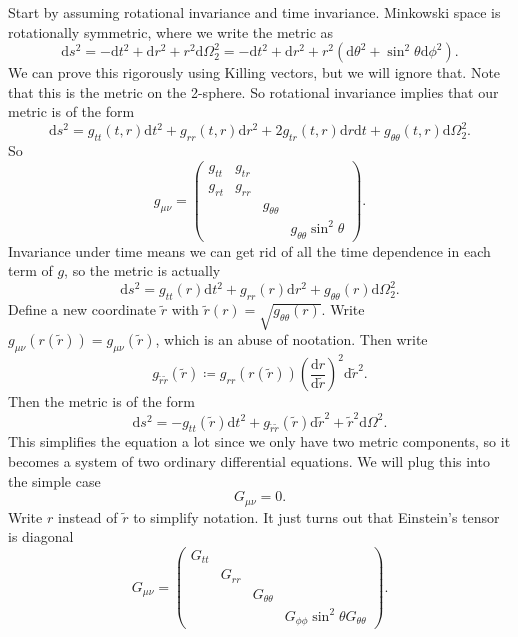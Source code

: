Start by assuming rotational invariance and time invariance. Minkowski space is rotationally symmetric, where we write the metric as
\[
	\mathrm{d} s^2=-\mathrm{d} t^2+\mathrm{d} r^2 + r^2 \mathrm{d} \Omega _2^2 = -\mathrm{d} t^2+\mathrm{d} r^2+r^2 \left( \mathrm{d} \theta ^2+ \sin ^2\theta \mathrm{d} \phi ^2 \right)  
.\]
We can prove this rigorously using Killing vectors, but we will ignore that. Note that this is the metric on the 2-sphere. So rotational invariance implies that our metric is of the form
\[
	\mathrm{d} s^2 = g_{tt} (t,r)\mathrm{d} t^2 + g_{rr} (t,r)\mathrm{d} r^2+2g_{tr} (t,r)\mathrm{d} r \mathrm{d} t+g_{\theta \theta }(t,r) \mathrm{d} \Omega _2^2
.\]
So
\[
	g_{\mu \nu } =\begin{pmatrix}
	g_{tt}  & g_{tr}  &  &  \\
	g_{rt}  & g_{rr}  &  &  \\
	 &  & g_{\theta \theta }  &  \\
	 &  &  & g_{\theta \theta } \sin ^2\theta 
	\end{pmatrix}
.\]
Invariance under time means we can get rid of all the time dependence in each term of $g$, so the metric is actually
\[
	\mathrm{d} s^2 = g_{tt} (r)\mathrm{d} t^2 + g_{rr} (r)\mathrm{d} r^2+g_{\theta \theta }(r) \mathrm{d} \Omega _2^2
.\]
Define a new coordinate $\widetilde{r} $ with $\widetilde{r} (r)=\sqrt{g_{\theta \theta } (r)} $. Write $g_{\mu \nu } (r(\widetilde{r} ))=g_{\mu \nu } (\widetilde{r} )$, which is an abuse of nootation. Then write
\[
	g_{\widetilde{r} \widetilde{r} } (\widetilde{r})\coloneqq g_{rr} (r(\widetilde{r} ))\left( \frac{\mathrm{d}r}{\mathrm{d}\widetilde{r} }  \right) ^2 \mathrm{d} \widetilde{r} ^2
.\]
Then the metric is of the form
\[
	\mathrm{d} s^2=-g_{tt} (\widetilde{r} )\mathrm{d} t^2+g_{\widetilde{r} \widetilde{r} } (\widetilde{r} )\mathrm{d} \widetilde{r} ^2+\widetilde{r} ^2\mathrm{d} \Omega ^2
.\]
This simplifies the equation a lot since we only have two metric components, so it becomes a system of two ordinary differential equations. We will plug this into the simple case
\[
	G_{\mu \nu } =0
.\]
Write $r$ instead of $\widetilde{r} $ to simplify notation. It just turns out that Einstein's tensor is diagonal
\[
	G_{\mu \nu } =\begin{pmatrix}
	G_{tt}  &  &  &  \\
	 & G_{rr}  &  &  \\
	 &  & G_{\theta \theta }  &  \\
	 &  &  & G_{\phi \phi } \sin ^2 \theta G_{\theta \theta } 
	\end{pmatrix}
.\]
